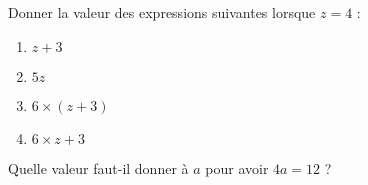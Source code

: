 
\begin{exercice}\label{exo2smath-0006}

    Donner la valeur des expressions suivantes lorsque \( z=4\) :
    \begin{multicols}{4}
        \begin{enumerate}
            \item
                \( z+3\)
            \item
                \( 5z\)
            \item
                \( 6\times(z+3)\)
            \item
                \( 6\times z+3\)
        \end{enumerate}
    \end{multicols}
    Quelle valeur faut-il donner à \( a\) pour avoir \( 4a=12\) ?

\end{exercice}
